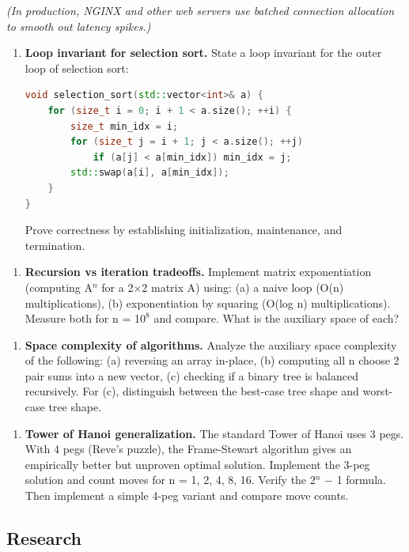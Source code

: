     \textit{(In production, NGINX and other web servers use batched connection allocation to smooth out latency spikes.)}

\begin{enumerate}
\item \textbf{Loop invariant for selection sort.} State a loop invariant for the outer loop of selection sort:
\begin{lstlisting}[language=C++]
void selection_sort(std::vector<int>& a) {
    for (size_t i = 0; i + 1 < a.size(); ++i) {
        size_t min_idx = i;
        for (size_t j = i + 1; j < a.size(); ++j)
            if (a[j] < a[min_idx]) min_idx = j;
        std::swap(a[i], a[min_idx]);
    }
}
\end{lstlisting}
Prove correctness by establishing initialization, maintenance, and termination.
\end{enumerate}

\begin{enumerate}
\item \textbf{Recursion vs iteration tradeoffs.} Implement matrix exponentiation (computing A$^{n}$ for a 2$\times$2 matrix A) using: (a) a naive loop (O(n) multiplications), (b) exponentiation by squaring (O(log n) multiplications). Measure both for n = 1$0^{8}$ and compare. What is the auxiliary space of each?
\end{enumerate}

\begin{enumerate}
\item \textbf{Space complexity of algorithms.} Analyze the auxiliary space complexity of the following: (a) reversing an array in-place, (b) computing all n choose 2 pair sums into a new vector, (c) checking if a binary tree is balanced recursively. For (c), distinguish between the best-case tree shape and worst-case tree shape.
\end{enumerate}

\begin{enumerate}
\item \textbf{Tower of Hanoi generalization.} The standard Tower of Hanoi uses 3 pegs. With 4 pegs (Reve's puzzle), the Frame-Stewart algorithm gives an empirically better but unproven optimal solution. Implement the 3-peg solution and count moves for n = 1, 2, 4, 8, 16. Verify the 2$^{n}$ $-$ 1 formula. Then implement a simple 4-peg variant and compare move counts.
\end{enumerate}

\subsection{Research}

